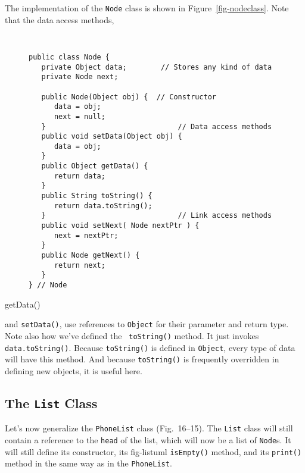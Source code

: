 The implementation of the {\tt Node} class is shown in
Figure~\ref{fig-nodeclass}.  Note that the data access methods, {\tt
\begin{figure}[h!]
\jjjprogstart
\begin{jjjlisting}
\begin{lstlisting}
public class Node {
   private Object data;        // Stores any kind of data
   private Node next;

   public Node(Object obj) {  // Constructor
      data = obj;
      next = null;
   }                               // Data access methods
   public void setData(Object obj) {
      data = obj;
   }
   public Object getData() {
      return data;
   }
   public String toString() {
      return data.toString();
   }                               // Link access methods
   public void setNext( Node nextPtr ) {
      next = nextPtr;
   }
   public Node getNext() {
      return next;
   }
} // Node
\end{lstlisting}
\end{jjjlisting}
\end{figure}
getData()} and {\tt setData()}, use references to {\tt Object} for
their parameter and return type.  Note also how we've defined the {\tt
toString()} method.  It just invokes {\tt data.toString()}. Because
{\tt toString()} is defined in {\tt Object}, every type of data will
have this method.  And because {\tt toString()} is frequently
overridden in defining new objects, it is useful here.


\subsection*{The {\tt List} Class}


\noindent Let's now generalize the {\tt PhoneList} class
(Fig.~16--15).  The {\tt List} class will still contain a
reference to the {\tt head} of the list, which will now be a list of
{\tt Node}s.  It will still define its constructor, its
 {fig-listuml}
{\tt isEmpty()} method, and its {\tt print()} method in the same way as in the
{\tt PhoneList}.

